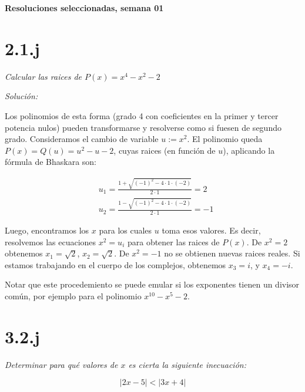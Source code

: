 \documentclass[10pt,a4paper]{article}
\begin{document}
\vspace{0,3cm}

\begin{center}
{\bf \Large Resoluciones seleccionadas, semana 01}
\end{center}

\vspace{0,3cm}

\section*{2.1.j}\emph{Calcular las raices de $P(x) = x^4-x^2-2$}


\noindent
\emph{Solución:}


\noindent
Los polinomios de esta forma (grado 4 con coeficientes en la primer y tercer
potencia nulos) pueden transformarse y resolverse como si fuesen de segundo
grado.
Consideramos el cambio de variable
$u := x^2$. El polinomio queda $P(x) = Q(u) = u^2-u-2$,
cuyas raices (en función de $u$), aplicando la f\'ormula
de Bhaskara son:

\begin{equation*}
  \begin{split}
    &u_1 = \frac{1 + \sqrt{(-1)^2-4\cdot 1 \cdot (-2)}}{2 \cdot 1} = 2\\
    &u_2 = \frac{1 - \sqrt{(-1)^2-4\cdot 1 \cdot (-2)}}{2 \cdot 1} = -1
  \end{split}
\end{equation*}

\noindent
Luego, encontramos los $x$ para los cuales $u$ toma esos valores.
Es decir, resolvemos las ecuaciones $x^2 = u_i$
para obtener las raices de $P(x)$.
De $x^2=2$ obtenemos $x_1=\sqrt{2}$, $x_2 = \sqrt{2}$. De $x^2=-1$ no se obtienen nuevas
raices reales. Si estamos trabajando en el cuerpo de los complejos,
obtenemos
$x_3 = i$, y $x_4 = -i$.

\noindent
Notar que este procedemiento se puede emular si los exponentes tienen un divisor común, por ejemplo para el polinomio $x^{10} - x^{5} - 2$.

\section*{3.2.j}
\emph{Determinar para qué valores de $x$ es cierta la siguiente inecuaci\'on:}

\begin{equation*}
  \vert 2x - 5 \vert  <  \vert 3x + 4 \vert
\end{equation*}
\end{document}
